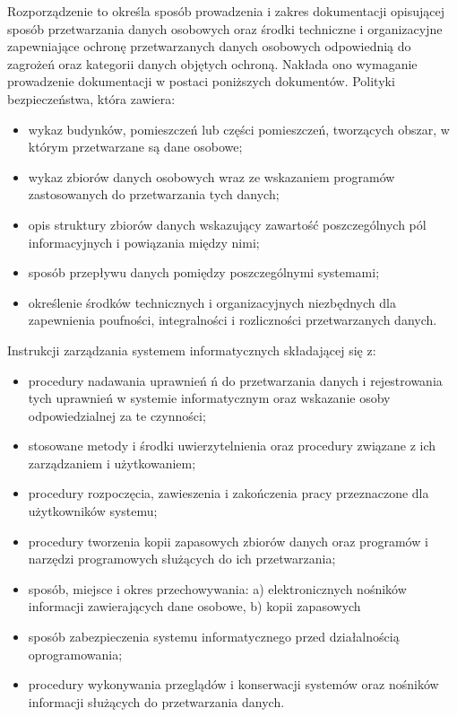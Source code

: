 Rozporządzenie to określa sposób prowadzenia i zakres dokumentacji opisującej sposób przetwarzania danych osobowych oraz środki techniczne i organizacyjne zapewniające ochronę przetwarzanych danych osobowych
odpowiednią do zagrożeń oraz kategorii danych objętych ochroną.
Nakłada ono wymaganie prowadzenie dokumentacji w postaci poniższych dokumentów.
Polityki bezpieczeństwa, która zawiera: 
\begin{itemize}
\item wykaz budynków, pomieszczeń lub części pomieszczeń, tworzących obszar, w którym przetwarzane są dane osobowe;
\item wykaz zbiorów danych osobowych wraz ze wskazaniem programów zastosowanych do przetwarzania tych danych;
\item opis struktury zbiorów danych wskazujący zawartość poszczególnych pól informacyjnych i powiązania między nimi;
\item sposób przepływu danych pomiędzy poszczególnymi systemami;
\item określenie środków technicznych i organizacyjnych niezbędnych dla zapewnienia poufności, integralności i rozliczności przetwarzanych danych.
\end{itemize}
Instrukcji zarządzania systemem informatycznych składającej się z:
\begin{itemize}
\item procedury nadawania uprawnień ń do przetwarzania danych i rejestrowania tych uprawnień w systemie informatycznym oraz wskazanie osoby odpowiedzialnej za te czynności;
\item stosowane metody i środki uwierzytelnienia oraz procedury związane z ich zarządzaniem i użytkowaniem;
\item procedury rozpoczęcia, zawieszenia i zakończenia pracy przeznaczone dla użytkowników systemu;
\item procedury tworzenia kopii zapasowych zbiorów danych oraz programów i narzędzi programowych służących do ich przetwarzania;
\item sposób, miejsce i okres przechowywania: a) elektronicznych nośników informacji zawierających dane osobowe, b) kopii zapasowych
\item sposób zabezpieczenia systemu informatycznego przed działalnością oprogramowania;
\item procedury wykonywania przeglądów i konserwacji systemów oraz nośników informacji służących do przetwarzania danych.
\end{itemize}

